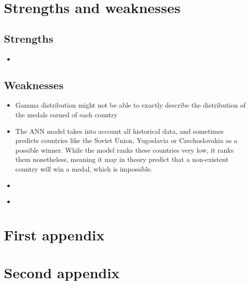 \documentclass{mcmthesis}
\begin{document}
\section{Strengths and weaknesses}


\subsection{Strengths}
\begin{itemize}
\item{}
\end{itemize}

\subsection{Weaknesses}
\begin{itemize}
\item {Gamma distribution might not be able to exactly describe the distribution of the medals earned of each country}
\item {The ANN model takes into account all historical data, and sometimes predicts countries like the Soviet Union, Yugoslavia or Czechoslovakia as a possible winner. While the model ranks these countries very low, it ranks them nonetheless, meaning it may in theory predict that a non-existent country will win a medal, which is impossible.}
\item \\

\item \\

\end{itemize}

\begin{thebibliography}{99}

\end{thebibliography}

\begin{appendices}

\section{First appendix}

\section{Second appendix}

\end{appendices}

\AImatter

\begin{ReportAiUse}{9}

\end{ReportAiUse}
\end{document}
